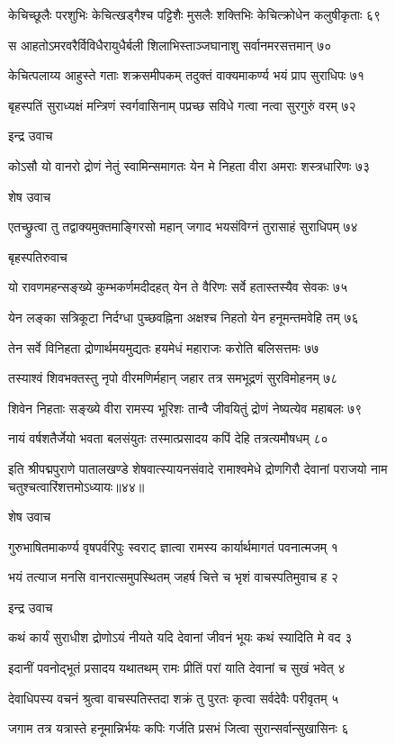 केचिच्छूलैः परशुभिः केचित्खड्गैश्च पट्टिशैः
मुसलैः शक्तिभिः केचित्क्रोधेन कलुषीकृताः ६९

स आहतोऽमरवरैर्विविधैरायुधैर्बली
शिलाभिस्ताञ्जघानाशु सर्वानमरसत्तमान् ७०

केचित्पलाय्य आहुस्ते गताः शक्रसमीपकम्
तदुक्तं वाक्यमाकर्ण्य भयं प्राप सुराधिपः ७१

बृहस्पतिं सुराध्यक्षं मन्त्रिणं स्वर्गवासिनाम्
पप्रच्छ सविधे गत्वा नत्वा सुरगुरुं वरम् ७२

इन्द्र उवाच

कोऽसौ यो वानरो द्रोणं नेतुं स्वामिन्समागतः
येन मे निहता वीरा अमराः शस्त्रधारिणः ७३

शेष उवाच

एतच्छ्रुत्वा तु तद्वाक्यमुक्तमाङ्गिरसो महान्
जगाद भयसंविग्नं तुरासाहं सुराधिपम् ७४

बृहस्पतिरुवाच

यो रावणमहन्सङ्ख्ये कुम्भकर्णमदीदहत्
येन ते वैरिणः सर्वे हतास्तस्यैव सेवकः ७५

येन लङ्का सत्रिकूटा निर्दग्धा पुच्छवह्निना
अक्षश्च निहतो येन हनूमन्तमवेहि तम् ७६

तेन सर्वे विनिहता द्रोणार्थमयमुद्यतः
हयमेधं महाराजः करोति बलिसत्तमः ७७

तस्याश्वं शिवभक्तस्तु नृपो वीरमणिर्महान्
जहार तत्र समभूद्रणं सुरविमोहनम् ७८

शिवेन निहताः सङ्ख्ये वीरा रामस्य भूरिशः
तान्वै जीवयितुं द्रोणं नेष्यत्येव महाबलः ७९

नायं वर्षशतैर्जेयो भवता बलसंयुतः
तस्मात्प्रसादय कपिं देहि तत्रत्यमौषधम् ८०

इति श्रीपद्मपुराणे पातालखण्डे शेषवात्स्यायनसंवादे रामाश्वमेधे द्रोणगिरौ देवानां पराजयो नाम चतुश्चत्वारिंशत्तमोऽध्यायः॥४४॥


शेष उवाच

गुरुभाषितमाकर्ण्य वृषपर्वरिपुः स्वराट्
ज्ञात्वा रामस्य कार्यार्थमागतं पवनात्मजम् १

भयं तत्याज मनसि वानरात्समुपस्थितम्
जहर्ष चित्ते च भृशं वाचस्पतिमुवाच ह २

इन्द्र उवाच

कथं कार्यं सुराधीश द्रोणोऽयं नीयते यदि
देवानां जीवनं भूयः कथं स्यादिति मे वद ३

इदानीं पवनोद्भूतं प्रसादय यथातथम्
रामः प्रीतिं परां याति देवानां च सुखं भवेत् ४

देवाधिपस्य वचनं श्रुत्वा वाचस्पतिस्तदा
शक्रं तु पुरतः कृत्वा सर्वदेवैः परीवृतम् ५

जगाम तत्र यत्रास्ते हनूमान्निर्भयः कपिः
गर्जति प्रसभं जित्वा सुरान्सर्वान्सुखासिनः ६

